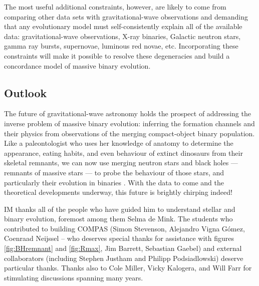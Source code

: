 \documentclass[iop,onecolumn]{revtex4}
\newcommand{\todo}[1]{\textcolor{red}{#1}}
\begin{document}
The most useful additional constraints, however, are likely to come from comparing other data sets with gravitational-wave observations and demanding that any evolutionary model must self-consistently explain all of the available data: gravitational-wave observations, X-ray binaries, Galactic neutron stars, gamma ray bursts, supernovae, luminous red novae, etc.   Incorporating these constraints will make it possible to resolve these degeneracies and build a concordance model of massive binary evolution.  %

\subsection{Outlook}
The future of gravitational-wave astronomy holds the prospect of addressing the inverse problem of massive binary evolution: inferring the formation channels and their physics from observations of the merging compact-object binary population.  Like a paleontologist who uses her knowledge of anatomy to determine the appearance, eating habits, and even behaviour of extinct dinosaurs from their skeletal remnants, we can now use merging neutron stars and black holes --- remnants of massive stars --- to probe the behaviour of those stars, and particularly their evolution in binaries \citep{MandelFarmer:2017}.   With the data to come and the theoretical developments underway, this future is brightly chirping indeed!


\begin{acknowledgements}
IM thanks all of the people who have guided him to understand stellar and binary evolution, foremost among them Selma de Mink.   The students who contributed to building COMPAS (Simon Stevenson, Alejandro Vigna G\'{o}mez, Coenraad Neijssel -- who deserves special thanks for assistance with figures \ref{fig:BHremnant} and \ref{fig:Rmax}, Jim Barrett, Sebastian Gaebel) and external collaborators (including Stephen Justham and Philipp Podsiadlowski) deserve particular thanks.  Thanks also to Cole Miller, Vicky Kalogera, and Will Farr for stimulating discussions spanning many years.
\end{acknowledgements}



\end{document}
